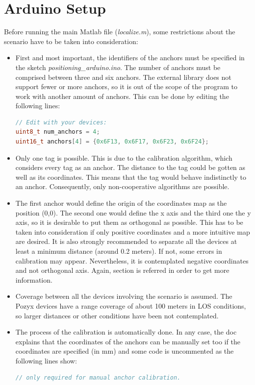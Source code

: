 \documentclass[a4paper, 21pt]{article} %
\begin{document}
\section{Arduino Setup}\label{se:arduino}
Before running the main Matlab file (\textit{localize.m}), some restrictions about the scenario have to be taken into consideration:
\begin{itemize}
\item First and most important, the identifiers of the anchors must be specified in the sketch \textit{positioning\_arduino.ino}. The number of anchors must be comprised between three and six anchors. The external library does not support fewer or more anchors, so it is out of the scope of the program to work with another amount of anchors. This can be done by editing the following lines:
\begin{lstlisting}[language=c, breaklines=true, commentstyle=\color{blue}, basicstyle=\ttfamily\small]
// Edit with your devices:
uint8_t num_anchors = 4;
uint16_t anchors[4] = {0x6F13, 0x6F17, 0x6F23, 0x6F24};
\end{lstlisting}
\item Only one tag is possible. This is due to the calibration algorithm, which considers every tag as an anchor. The distance to the tag could be gotten as well as its coordinates. This means that the tag would behave indistinctly to an anchor. Consequently, only non-cooperative algorithms are possible.
\item The first anchor would define the origin of the coordinates map as the position (0,0). The second one would define the x axis and the third one the y axis, so it is desirable to put them as orthogonal as possible. This has to be taken into consideration if only positive coordinates and a more intuitive map are desired. It is also strongly recommended to separate all the devices at least a minimum distance (around 0.2 meters). If not, some errors in calibration may appear. Nevertheless, it is contemplated negative coordinates and not orthogonal axis. Again, section \cite{Pozyx:localize} is referred in order to get more information.
\item Coverage between all the devices involving the scenario is assumed. The Pozyx devices have a range coverage of about 100 meters in LOS conditions, so larger distances or other conditions have been not contemplated.
\item The process of the calibration is automatically done. In any case, the doc explains that the coordinates of the anchors can be manually set too if the coordinates are specified (in mm) and some code is uncommented as the following lines show:
\begin{lstlisting}[language=c, breaklines=true, commentstyle=\color{blue}, basicstyle=\ttfamily\small]
// only required for manual anchor calibration. 


\end{lstlisting}
\end{itemize}
\end{document}
